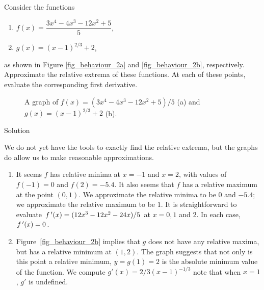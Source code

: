 \begin{example}\label{ex_extval2}
Consider the functions
\begin{multicols}{2}
\begin{enumerate}
\item $f(x) = \dfrac{3x^4-4x^3-12x^2+5}{5}$, 
\item $g(x) = (x-1)^{2/3}+2$,
\end{enumerate}
\end{multicols}
as shown in Figure \ref{fig_behaviour_2a} and \ref{fig_behaviour_2b}, respectively. Approximate the relative extrema of these functions. At each of these points, evaluate the corresponding first derivative.

\begin{figure}[H]
\centering
\qquad
{}
\caption{A graph of $f(x) = (3x^4-4x^3-12x^2+5)/5$ (a) and $g(x) = (x-1)^{2/3}+2$ (b). }
\end{figure}

Solution 

We do not yet have the tools to exactly find the relative extrema, but the graphs do allow us to make reasonable approximations. 
\begin{enumerate}
\item It seems $f$ has relative minima at $x=-1$ and $x=2$, with values of $f(-1)=0$ and $f(2) = -5.4$. It also seems that $f$ has a relative maximum at the point $(0,1)$.  We approximate the relative minima to be $0$ and $-5.4$; we approximate the relative maximum to be $1$. It is straightforward to evaluate $f\,'(x) =(12x^3-12x^2-24x)/5$ at $x=0, 1$ and $2$. In each case, $f\,'(x) = 0$. 
\item Figure~\ref{fig_behaviour_2b} implies that $g$ does not have any relative maxima, but has a relative minimum at $(1,2)$. The graph suggests that not only is this point a relative minimum, $y=g(1)=2$ is the absolute minimum value of the function. We compute $g'(x) = 2/3(x-1)^{-1/3}$ note that when $x=1$, $g'$ is undefined.
\end{enumerate}
\end{example}

